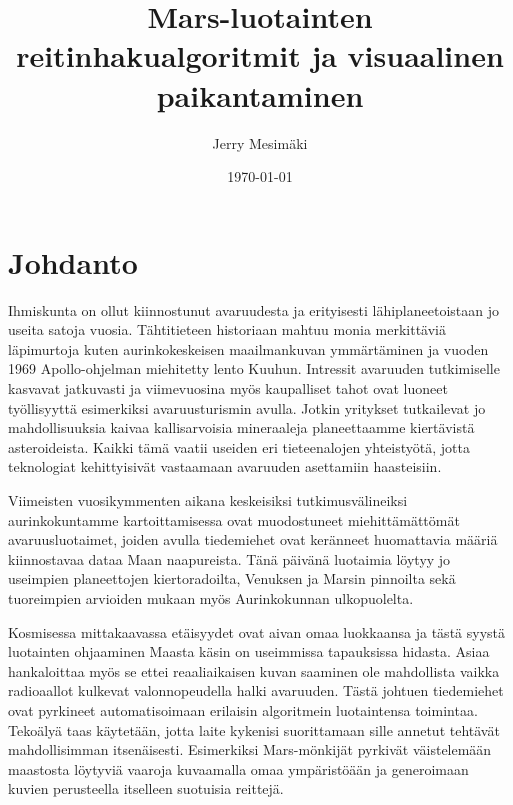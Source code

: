 \documentclass[finnish]{tktltiki2}
\title{Mars-luotainten reitinhakualgoritmit ja visuaalinen paikantaminen}
\author{Jerry Mesimäki}
\date{\today}
\theoremstyle{definition}
\theoremstyle{remark}
\begin{document}

\frontmatter      %

\maketitle        %
\makeabstract     %

\tableofcontents  %


\mainmatter       %

\section{Johdanto}

Ihmiskunta on ollut kiinnostunut avaruudesta ja erityisesti lähiplaneetoistaan jo useita satoja vuosia. Tähtitieteen historiaan mahtuu monia merkittäviä läpimurtoja kuten aurinkokeskeisen maailmankuvan ymmärtäminen ja vuoden 1969 Apollo-ohjelman miehitetty lento Kuuhun. Intressit avaruuden tutkimiselle kasvavat jatkuvasti ja viimevuosina myös kaupalliset tahot ovat luoneet työllisyyttä esimerkiksi avaruusturismin avulla. Jotkin yritykset tutkailevat jo mahdollisuuksia kaivaa kallisarvoisia mineraaleja planeettaamme kiertävistä asteroideista. Kaikki tämä vaatii useiden eri tieteenalojen yhteistyötä, jotta teknologiat kehittyisivät vastaamaan avaruuden asettamiin haasteisiin.

Viimeisten vuosikymmenten aikana keskeisiksi tutkimusvälineiksi aurinkokuntamme kartoittamisessa ovat muodostuneet miehittämättömät avaruusluotaimet, joiden avulla tiedemiehet ovat keränneet huomattavia määriä kiinnostavaa dataa Maan naapureista. Tänä päivänä luotaimia löytyy jo useimpien planeettojen kiertoradoilta, Venuksen ja Marsin pinnoilta sekä tuoreimpien arvioiden mukaan myös Aurinkokunnan ulkopuolelta.

Kosmisessa mittakaavassa etäisyydet ovat aivan omaa luokkaansa ja tästä syystä luotainten ohjaaminen Maasta käsin on useimmissa tapauksissa hidasta. Asiaa hankaloittaa myös se ettei reaaliaikaisen kuvan saaminen ole mahdollista vaikka radioaallot kulkevat valonnopeudella halki avaruuden. Tästä johtuen tiedemiehet ovat pyrkineet automatisoimaan erilaisin algoritmein luotaintensa toimintaa. Tekoälyä taas käytetään, jotta laite kykenisi suorittamaan sille annetut tehtävät mahdollisimman itsenäisesti. Esimerkiksi Mars-mönkijät pyrkivät väistelemään maastosta löytyviä vaaroja kuvaamalla omaa ympäristöään ja generoimaan kuvien perusteella itselleen suotuisia reittejä.
\end{document}
